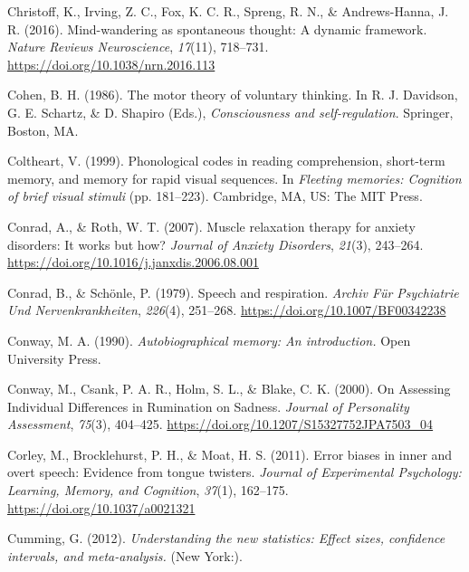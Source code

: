 \documentclass[a4paper,12pt,twoside,openright,oldfontcommands]{memoir}
\begin{document}
\leavevmode\hypertarget{ref-christoff_mind-wandering_2016}{}%
Christoff, K., Irving, Z. C., Fox, K. C. R., Spreng, R. N., \& Andrews-Hanna, J. R. (2016). Mind-wandering as spontaneous thought: A dynamic framework. \emph{Nature Reviews Neuroscience}, \emph{17}(11), 718--731. \url{https://doi.org/10.1038/nrn.2016.113}

\leavevmode\hypertarget{ref-cohen_motor_1986}{}%
Cohen, B. H. (1986). The motor theory of voluntary thinking. In R. J. Davidson, G. E. Schartz, \& D. Shapiro (Eds.), \emph{Consciousness and self-regulation}. Springer, Boston, MA.

\leavevmode\hypertarget{ref-coltheart_phonological_1999}{}%
Coltheart, V. (1999). Phonological codes in reading comprehension, short-term memory, and memory for rapid visual sequences. In \emph{Fleeting memories: Cognition of brief visual stimuli} (pp. 181--223). Cambridge, MA, US: The MIT Press.

\leavevmode\hypertarget{ref-conrad_muscle_2007}{}%
Conrad, A., \& Roth, W. T. (2007). Muscle relaxation therapy for anxiety disorders: It works but how? \emph{Journal of Anxiety Disorders}, \emph{21}(3), 243--264. \url{https://doi.org/10.1016/j.janxdis.2006.08.001}

\leavevmode\hypertarget{ref-conrad_speech_1979}{}%
Conrad, B., \& Schönle, P. (1979). Speech and respiration. \emph{Archiv Für Psychiatrie Und Nervenkrankheiten}, \emph{226}(4), 251--268. \url{https://doi.org/10.1007/BF00342238}

\leavevmode\hypertarget{ref-conway_autobiographical_1990}{}%
Conway, M. A. (1990). \emph{Autobiographical memory: An introduction.} Open University Press.

\leavevmode\hypertarget{ref-conway_assessing_2000}{}%
Conway, M., Csank, P. A. R., Holm, S. L., \& Blake, C. K. (2000). On Assessing Individual Differences in Rumination on Sadness. \emph{Journal of Personality Assessment}, \emph{75}(3), 404--425. \url{https://doi.org/10.1207/S15327752JPA7503_04}

\leavevmode\hypertarget{ref-corley_error_2011}{}%
Corley, M., Brocklehurst, P. H., \& Moat, H. S. (2011). Error biases in inner and overt speech: Evidence from tongue twisters. \emph{Journal of Experimental Psychology: Learning, Memory, and Cognition}, \emph{37}(1), 162--175. \url{https://doi.org/10.1037/a0021321}

\leavevmode\hypertarget{ref-Cumming2012}{}%
Cumming, G. (2012). \emph{Understanding the new statistics: Effect sizes, confidence intervals, and meta-analysis.} (New York:).
\end{document}
